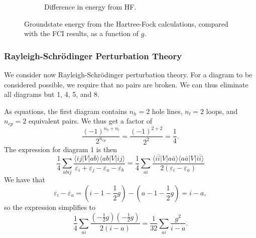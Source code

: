 \begin{figure}
\begin{subfigure}[b]{0.5\textwidth}
        \caption{
            Difference in energy from HF.\label{fig:hf_diff}
        }
    \end{subfigure}
    \caption{
        Groundstate energy from the Hartree-Fock calculations, compared with the FCI results, as a function of $g$.
    }
\end{figure}


\subsubsection*{Rayleigh-Schr\"odinger Perturbation Theory}
We consider now Rayleigh-Schr\"odinger perturbation theory.
For a diagram to be considered possible, we require that no pairs are broken.
We can thus eliminate all diagrams but 1, 4, 5, and 8. %

As equations, the first diagram contains $n_h = 2$ hole lines, $n_l = 2$ loops, and $n_{ep} = 2$ equivalent pairs.
We thus get a factor of
\begin{equation*}
    \frac{(-1)^{n_h + n_l}}{2^{n_{ep}}} = \frac{(-1)^{2+2}}{2^2} = \frac{1}{4}.
\end{equation*}
The expression for diagram 1 is then
\begin{equation*}
    \frac{1}{4} \sum_{abij} \frac{
        \langle ij \lvert V \rvert ab \rangle
        \langle ab \lvert V \rvert ij \rangle
    }{\varepsilon_i + \varepsilon_j - \varepsilon_a - \varepsilon_b}
    =
    \frac{1}{4} \sum_{ai} \frac{
        \langle i \bar{i} \vert V \vert a \bar{a} \rangle %
        \langle a \bar{a} \vert V \vert i \bar{i} \rangle %
    }{2(\varepsilon_i - \varepsilon_a)}
\end{equation*}
We have that
\begin{equation*}
    \varepsilon_i - \varepsilon_a = \left( i - 1 - \frac{1}{2} g \right) - \left( a - 1 - \frac{1}{2} g \right) = i - a,
\end{equation*}
so the expression simplifies to
\begin{equation*}
    \frac{1}{4} \sum_{ai} \frac{
        (-\frac{1}{2} g)(-\frac{1}{2} g)
    }{2(i - a)} = \frac{1}{32} \sum_{ai} \frac{g^2}{i - a}.
\end{equation*}


